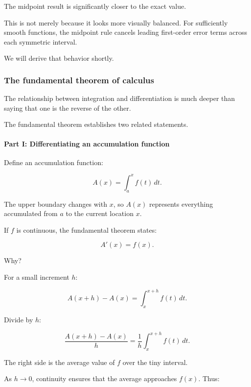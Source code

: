 The midpoint result is significantly closer to the exact value.

This is not merely because it looks more visually balanced. For sufficiently smooth functions, the midpoint rule cancels leading first-order error terms across each symmetric interval.

We will derive that behavior shortly.

\subsubsection{The fundamental theorem of calculus}\label{02-foundations-ii-ch022-the-fundamental-theorem-of-calculus}

\hypertarget{02-foundations-ii-ch022-the-fundamental-theorem-of-calculus}{}

The relationship between integration and differentiation is much deeper than saying that one is the reverse of the other.

The fundamental theorem establishes two related statements.

\paragraph{Part I: Differentiating an accumulation function}\label{02-foundations-ii-ch022-part-i-differentiating-an-accumulation-function}

\hypertarget{02-foundations-ii-ch022-part-i-differentiating-an-accumulation-function}{}

Define an accumulation function:

\[
A(x)=\int_a^x f(t)\,dt.
\]

The upper boundary changes with \(x\), so \(A(x)\) represents everything accumulated from \(a\) to the current location \(x\).

If \(f\) is continuous, the fundamental theorem states:

\[
\boxed{A'(x)=f(x)}.
\]

Why?

For a small increment \(h\):

\[
A(x+h)-A(x)=\int_x^{x+h}f(t)\,dt.
\]

Divide by \(h\):

\[
\frac{A(x+h)-A(x)}h = \frac1h\int_x^{x+h}f(t)\,dt.
\]

The right side is the average value of \(f\) over the tiny interval.

As \(h\to0\), continuity ensures that the average approaches \(f(x)\). Thus:

